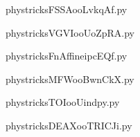 
    \newcommand{\CaptionFigFSSAooLvkqAf}{<+Type your caption here+>}
    \begin{center}
        
    \end{center}
    phystricksFSSAooLvkqAf.py

    

    \clearpage
    


    \newcommand{\CaptionFigVGVIooUoZpRA}{<+Type your caption here+>}
    \begin{center}
        
    \end{center}
    phystricksVGVIooUoZpRA.py

    

    \clearpage
    


    \newcommand{\CaptionFigFnAffineipcEQf}{<+Type your caption here+>}
    \begin{center}
        
    \end{center}
    phystricksFnAffineipcEQf.py

    

    \clearpage
    


    \newcommand{\CaptionFigMFWooBwnCkX}{<+Type your caption here+>}
    \begin{center}
        
    \end{center}
    phystricksMFWooBwnCkX.py

    

    \clearpage
    


    \newcommand{\CaptionFigTOIooUindpy}{<+Type your caption here+>}
    \begin{center}
        
    \end{center}
    phystricksTOIooUindpy.py

    

    \clearpage
    


    \newcommand{\CaptionFigDEAXooTRICJi}{<+Type your caption here+>}
    \begin{center}
        
    \end{center}
    phystricksDEAXooTRICJi.py

